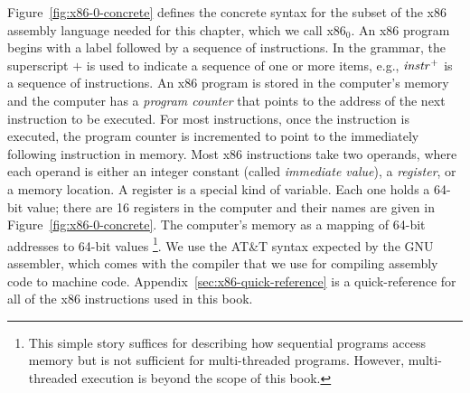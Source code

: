 \documentclass[11pt]{book}
\begin{document}
Figure~\ref{fig:x86-0-concrete} defines the concrete syntax for the subset of
the x86 assembly language needed for this chapter, which we call x86$_0$.
%
An x86 program begins with a  label followed by a sequence
of instructions.  In the grammar, the superscript $+$ is used to
indicate a sequence of one or more items, e.g., $\mathit{instr}^{+}$ is a
sequence of instructions.
%
An x86 program is stored in the computer's memory and the computer has
a \emph{program counter} that points to the address of the next
instruction to be executed. For most instructions, once the
instruction is executed, the program counter is incremented to point
to the immediately following instruction in memory. Most x86
instructions take two operands, where each operand is either an
integer constant (called \emph{immediate value}), a \emph{register},
or a memory location.  A register is a special kind of variable. Each
one holds a 64-bit value; there are 16 registers in the computer and
their names are given in Figure~\ref{fig:x86-0-concrete}. The computer's memory
as a mapping of 64-bit addresses to 64-bit values%
\footnote{This simple story suffices for describing how sequential
  programs access memory but is not sufficient for multi-threaded
  programs. However, multi-threaded execution is beyond the scope of
  this book.}.
%
We use the AT\&T syntax expected by the GNU assembler, which comes
with the  compiler that we use for compiling assembly code to
machine code.
%
Appendix~\ref{sec:x86-quick-reference} is a quick-reference for all of
the x86 instructions used in this book.



\newcommand{\allregisters}{\key{rsp} \mid \key{rbp} \mid \key{rax} \mid \key{rbx} \mid \key{rcx}
              \mid \key{rdx} \mid \key{rsi} \mid \key{rdi} \mid \\
              && \key{r8} \mid \key{r9} \mid \key{r10}
              \mid \key{r11} \mid \key{r12} \mid \key{r13}
              \mid \key{r14} \mid \key{r15}}
\end{document}
